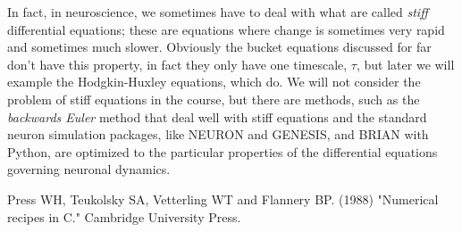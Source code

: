 \documentclass[11pt,a4paper]{scrartcl}
\begin{document}
In fact, in neuroscience, we sometimes have to deal with what are
called \textsl{stiff} differential equations; these are equations
where change is sometimes very rapid and sometimes much
slower. Obviously the bucket equations discussed for far don't have
this property, in fact they only have one timescale, $\tau$, but later
we will example the Hodgkin-Huxley equations, which do. We will not
consider the problem of stiff equations in the course, but there are
methods, such as the \textsl{backwards Euler} method that deal well
with stiff equations and the standard neuron simulation packages, like
NEURON and GENESIS, and BRIAN with Python, are optimized to the
particular properties of the differential equations governing neuronal
dynamics.

\begin{thebibliography}{10}

Press WH, Teukolsky SA, Vetterling WT and Flannery BP. (1988) "Numerical recipes in C." Cambridge University Press.

\end{thebibliography}
\end{document}
